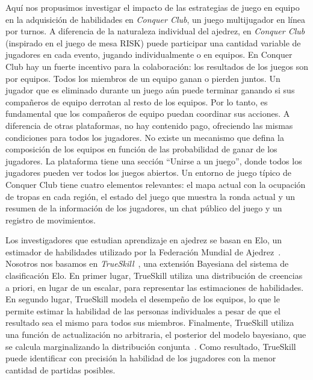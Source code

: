 \documentclass[a4paper,11pt]{book}
\theoremstyle{definition}
\begin{document}
Aquí nos propusimos investigar el impacto de las estrategias de juego en equipo en la adquisición de habilidades en \emph{Conquer Club}, un juego multijugador en línea por turnos.
%
A diferencia de la naturaleza individual del ajedrez, en \emph{Conquer Club} (inspirado en el juego de mesa RISK) puede participar una cantidad variable de jugadores en cada evento, jugando individualmente o en equipos.
%
En Conquer Club hay un fuerte incentivo para la colaboración: los resultados de los juegos son por equipos.
%
Todos los miembros de un equipo ganan o pierden juntos.
%
Un jugador que es eliminado durante un juego aún puede terminar ganando si sus compañeros de equipo derrotan al resto de los equipos.
%
Por lo tanto, es fundamental que los compañeros de equipo puedan coordinar sus acciones.
%
A diferencia de otras plataformas, no hay contenido pago, ofreciendo las mismas condiciones para todos los jugadores.
%
No existe un mecanismo que defina la composición de los equipos en función de las probabilidad de ganar de los jugadores.
%
La plataforma tiene una sección ``Unirse a un juego'', donde todos los jugadores pueden ver todos los juegos abiertos.
%
Un entorno de juego típico de Conquer Club tiene cuatro elementos relevantes: el mapa actual con la ocupación de tropas en cada región, el estado del juego que muestra la ronda actual y un resumen de la información de los jugadores, un chat público del juego y un registro de movimientos.


Los investigadores que estudian aprendizaje en ajedrez se basan en Elo, un estimador de habilidades utilizado por la Federación Mundial de Ajedrez~\cite{glickman1995-guideToChessRatings,glickman2001}.
%
Nosotros nos basamos en \emph{TrueSkill}~\cite{Herbrich2007}, una extensión Bayesiana del sistema de clasificación Elo.
%
En primer lugar, TrueSkill utiliza una distribución de creencias a priori, en lugar de un escalar, para representar las estimaciones de habilidades.
%
En segundo lugar, TrueSkill modela el desempeño de los equipos, lo que le permite estimar la habilidad de las personas individuales a pesar de que el resultado sea el mismo para todos sus miembros.
%
Finalmente, TrueSkill utiliza una función de actualización no arbitraria, el posterior del modelo bayesiano, que se calcula marginalizando la distribución conjunta~\cite{Kschischang2001}.
%
Como resultado, TrueSkill puede identificar con precisión la habilidad de los jugadores con la menor cantidad de partidas posibles.

\end{document}
